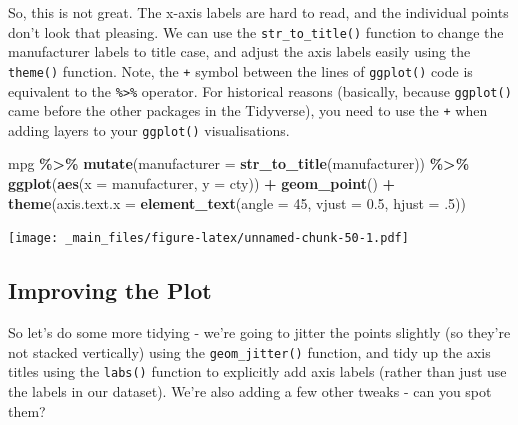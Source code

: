 \documentclass[
]{book}
\newenvironment{Shaded}{\begin{snugshade}}{\end{snugshade}}
\newcommand{\AttributeTok}[1]{\textcolor[rgb]{0.13,0.29,0.53}{#1}}
\newcommand{\DecValTok}[1]{\textcolor[rgb]{0.00,0.00,0.81}{#1}}
\newcommand{\FloatTok}[1]{\textcolor[rgb]{0.00,0.00,0.81}{#1}}
\newcommand{\FunctionTok}[1]{\textcolor[rgb]{0.13,0.29,0.53}{\textbf{#1}}}
\newcommand{\NormalTok}[1]{#1}
\newcommand{\SpecialCharTok}[1]{\textcolor[rgb]{0.81,0.36,0.00}{\textbf{#1}}}
\begin{document}
So, this is not great. The x-axis labels are hard to read, and the individual points don't look that pleasing. We can use the \texttt{str\_to\_title()} function to change the manufacturer labels to title case, and adjust the axis labels easily using the \texttt{theme()} function. Note, the \texttt{+} symbol between the lines of \texttt{ggplot()} code is equivalent to the \texttt{\%\textgreater{}\%} operator. For historical reasons (basically, because \texttt{ggplot()} came before the other packages in the Tidyverse), you need to use the \texttt{+} when adding layers to your \texttt{ggplot()} visualisations.

\begin{Shaded}
\begin{Highlighting}[]
\NormalTok{mpg }\SpecialCharTok{\%\textgreater{}\%}
  \FunctionTok{mutate}\NormalTok{(}\AttributeTok{manufacturer =} \FunctionTok{str\_to\_title}\NormalTok{(manufacturer)) }\SpecialCharTok{\%\textgreater{}\%}
  \FunctionTok{ggplot}\NormalTok{(}\FunctionTok{aes}\NormalTok{(}\AttributeTok{x =}\NormalTok{ manufacturer, }\AttributeTok{y =}\NormalTok{ cty)) }\SpecialCharTok{+} 
  \FunctionTok{geom\_point}\NormalTok{() }\SpecialCharTok{+}
  \FunctionTok{theme}\NormalTok{(}\AttributeTok{axis.text.x =} \FunctionTok{element\_text}\NormalTok{(}\AttributeTok{angle =} \DecValTok{45}\NormalTok{, }\AttributeTok{vjust =} \FloatTok{0.5}\NormalTok{, }\AttributeTok{hjust =}\NormalTok{ .}\DecValTok{5}\NormalTok{))}
\end{Highlighting}
\end{Shaded}

\texttt{[image: \_main\_files/figure-latex/unnamed-chunk-50-1.pdf]}

\hypertarget{improving-the-plot}{%
\subsection{Improving the Plot}\label{improving-the-plot}}

So let's do some more tidying - we're going to jitter the points slightly (so they're not stacked vertically) using the \texttt{geom\_jitter()} function, and tidy up the axis titles using the \texttt{labs()} function to explicitly add axis labels (rather than just use the labels in our dataset). We're also adding a few other tweaks - can you spot them?
\end{document}
